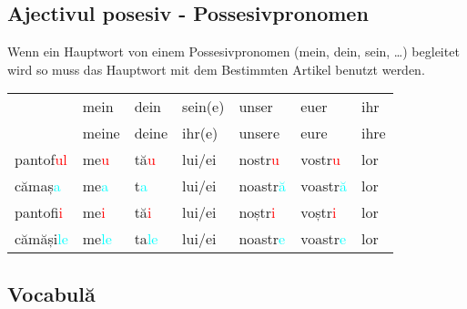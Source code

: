 \documentclass[11pt, oneside]{article}
\begin{document}
\subsection{Ajectivul posesiv - Possesivpronomen}
Wenn ein Hauptwort von einem Possesivpronomen (mein, dein, sein, \dots) begleitet wird 
so muss das Hauptwort mit dem Bestimmten Artikel benutzt werden.
%
\begin{center}
  \begin{tabular}{ | C{1.7cm}| C{1.7cm} | C{1.7cm} | C{1.7cm} | C{1.7cm} | C{1.7cm} | C{1.7cm} |}
    \hline
              & mein & dein & sein(e) & unser & euer & ihr\\
              & meine & deine & ihr(e) & unsere & eure & ihre\\
    \hline
    pantof\textcolor{Red}{ul}  & me\textcolor{Red}{u} & tă\textcolor{Red}{u} & lui/ei & nostr\textcolor{Red}{u} & vostr\textcolor{Red}{u} & lor\\
    \hline
    cămaș\textcolor{Cyan}{a} & me\textcolor{Cyan}{a} & t\textcolor{Cyan}{a} & lui/ei & noastr\textcolor{Cyan}{ă} & voastr\textcolor{Cyan}{ă} & lor\\
    \hline
    pantofi\textcolor{Red}{i} & me\textcolor{Red}{i} & tă\textcolor{Red}{i} & lui/ei & noștr\textcolor{Red}{i} & voștr\textcolor{Red}{i} & lor\\
    \hline
    cămăși\textcolor{Cyan}{le} & me\textcolor{Cyan}{le} & ta\textcolor{Cyan}{le} & lui/ei & noastr\textcolor{Cyan}{e} & voastr\textcolor{Cyan}{e} & lor\\
    \hline
  \end{tabular}
\end{center}




\subsection{Vocabulă}
\end{document}
